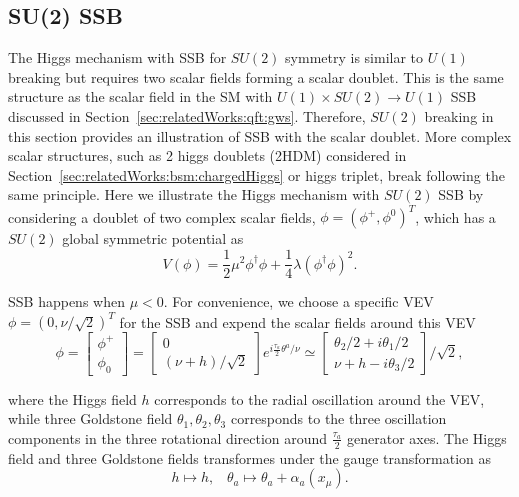 \subsection{SU(2) SSB}
The Higgs mechanism with SSB for $SU(2)$ symmetry is similar to $U(1)$ breaking but requires two scalar fields forming a scalar doublet. This is the same structure as the scalar field in the SM with $U(1)\times SU(2) \to U(1)$ SSB discussed in Section~\ref{sec:relatedWorks:qft:gws}. Therefore,  $SU(2)$ breaking in this section provides an illustration of SSB with the scalar doublet. More complex scalar structures, such as 2 higgs doublets (2HDM) considered in Section~\ref{sec:relatedWorks:bsm:chargedHiggs} or higgs triplet, break following the same principle. Here we illustrate the Higgs mechanism with $SU(2)$ SSB by considering a doublet of two complex scalar fields, $\phi = (\phi^+, \phi^0)^T$, which has a $SU(2)$  global symmetric potential as
\begin{equation}
    V(\phi) = \frac{1}{2} \mu^2 \phi^\dagger\phi + \frac{1}{4} \lambda(\phi^\dagger\phi )^2.
\end{equation}

\noindent SSB happens when $\mu<0$. For convenience, we choose a specific VEV $\phi = (0, \nu/\sqrt{2})^T$ for the SSB and expend the scalar fields around this VEV
\begin{equation}
    \phi = \begin{bmatrix} \phi^+ \\ \phi_0 \end{bmatrix} =
    \begin{bmatrix} 0 \\ (\nu + h)/\sqrt{2} \end{bmatrix} e^{i \frac{\tau_a}{2} \theta^a  /\nu}
    \simeq \begin{bmatrix} \theta_2/2 + i\theta_1/2 \\ \nu + h - i\theta_3/2 \end{bmatrix} /\sqrt{2},
    \label{eqn:relatedWorks:qft:su2Higgs}
\end{equation}

\noindent where the Higgs field $h$ corresponds to the radial oscillation around the VEV, while three Goldstone field $\theta_1,\theta_2,\theta_3$ corresponds to the three oscillation components in the three rotational direction around $\frac{\tau_a}{2}$ generator axes. The Higgs field and three Goldstone fields transformes under the gauge transformation as 
\begin{equation}
    h  \longmapsto  h ,\;\;\; 
    \theta_a  \longmapsto  \theta_a + \alpha_a(x_\mu).
\end{equation}





